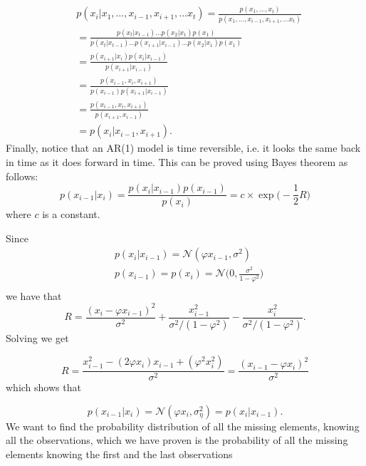 \begin{align*}
    &p(x_i | x_1, \dots, x_{i-1}, x_{i+1}, \dots x_t) = \frac{p(x_1,\dots, x_t)}{p(x_1, \dots, x_{i-1}, x_{i+1}, \dots x_t)}\\
    &= \frac{p(x_t | x_{t-1})\dots p(x_2 | x_1) p(x_1)}{p(x_t | x_{t-1})\dots p(x_{i+1} | x_{i-1}) \dots p(x_2 | x_1) p(x_1)}\\
    &= \frac{p(x_{i+1} | x_i) p(x_i | x_{i-1})}{p(x_{i+1} | x_{i-1})}\\
    &= \frac{p(x_{i-1}, x_i, x_{i+1})}{p(x_{i-1}) p(x_{i+1} | x_{i-1})}\\
    &= \frac{p(x_{i-1}, x_i, x_{i+1})}{p(x_{i+1}, x_{i-1})}\\
    &= p(x_i | x_{i-1}, x_{i+1}).
\end{align*}
Finally, notice that an AR(1) model is time reversible, i.e. it looks the same back in time as it does forward in time.
This can be proved using Bayes theorem as follows:
\begin{equation*}
    p(x_{i-1} | x_i) = \frac{p(x_i | x_{i-1}) p(x_{i-1})}{p(x_i)} = c\times \exp\Big(-\frac{1}{2} R\Big)
\end{equation*}
where $c$ is a constant.

Since
\begin{align*}
    &p(x_i | x_{i-1}) = \mathcal{N}(\varphi x_{i-1}, \sigma^2)\\
    &p(x_{i-1}) = p(x_i) = \mathcal{N} \Bigg(0, \frac{\sigma^2}{1-\varphi^2} \Bigg)\\
\end{align*}
we have that
\begin{equation*}
    R = \frac{(x_i - \varphi x_{i-1})^2}{\sigma^2} + \frac{x_{i-1}^2}{\sigma^2 / (1-\varphi^2)} - \frac{x_{i}^2}{\sigma^2 / (1-\varphi^2)}.
\end{equation*}
Solving we get

\begin{equation*}
    R = \frac{x_{i-1}^2 - (2\varphi x_i) x_{i-1}+ (\varphi^2 x_i^2)}{\sigma^2} = \frac{(x_{i-1} - \varphi x_i)^2}{\sigma^2}
\end{equation*}
which shows that

\begin{equation*}
    p(x_{i-1} | x_i) = \mathcal{N}(\varphi x_i, \sigma^2_\eta) = p(x_i | x_{i-1}).
\end{equation*}
We want to find the probability distribution of all the missing elements, knowing all the observations, which we have proven is the probability of all the missing elements knowing the first and the last observations

